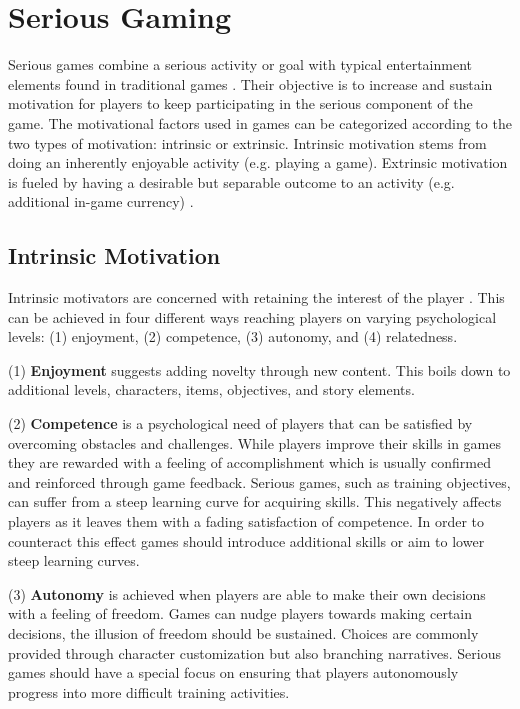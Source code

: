 \section{Serious Gaming} \label{sec:serious-gaming}
Serious games combine a serious activity or goal with typical entertainment elements found in traditional games \cite{Boendermaker2015}.
Their objective is to increase and sustain motivation for players to keep participating in the serious component of the game.
The motivational factors used in games can be categorized according to the two types of motivation: intrinsic or extrinsic.
Intrinsic motivation stems from doing an inherently enjoyable activity (e.g. playing a game).
Extrinsic motivation is fueled by having a desirable but separable outcome to an activity (e.g. additional in-game currency) \cite{Ryan2000}.

\subsection{Intrinsic Motivation}
Intrinsic motivators are concerned with retaining the interest of the player \cite{Birk2016}.
This can be achieved in four different ways reaching players on varying psychological levels: (1) enjoyment, (2) competence, (3) autonomy, and (4) relatedness.

(1) \textbf{Enjoyment} suggests adding novelty through new content.
This boils down to additional levels, characters, items, objectives, and story elements.

(2) \textbf{Competence} is a psychological need of players that can be satisfied by overcoming obstacles and challenges.
While players improve their skills in games they are rewarded with a feeling of accomplishment which is usually confirmed and reinforced through game feedback.
Serious games, such as training objectives, can suffer from a steep learning curve for acquiring skills.
This negatively affects players as it leaves them with a fading satisfaction of competence.
In order to counteract this effect games should introduce additional skills or aim to lower steep learning curves.

(3) \textbf{Autonomy} is achieved when players are able to make their own decisions with a feeling of freedom.
Games can nudge players towards making certain decisions, the illusion of freedom should be sustained.
Choices are commonly provided through character customization but also branching narratives.
Serious games should have a special focus on ensuring that players autonomously progress into more difficult training activities.

